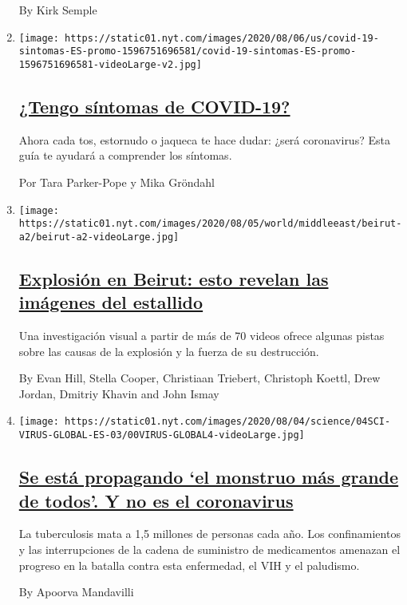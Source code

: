 \begin{enumerate}
  By Kirk Semple
\item
  \texttt{[image: https://static01.nyt.com/images/2020/08/06/us/covid-19-sintomas-ES-promo-1596751696581/covid-19-sintomas-ES-promo-1596751696581-videoLarge-v2.jpg]}

  \hypertarget{tengo-suxedntomas-de-covid-19}{%
  \subsection{\texorpdfstring{\href{/es/interactive/2020/08/06/espanol/ciencia-y-tecnologia/tengo-covid-19-sintomas.html}{¿Tengo
  síntomas de
  COVID-19?}}{¿Tengo síntomas de COVID-19?}}\label{tengo-suxedntomas-de-covid-19}}

  Ahora cada tos, estornudo o jaqueca te hace dudar: ¿será coronavirus?
  Esta guía te ayudará a comprender los síntomas.

  Por Tara Parker-Pope y Mika Gröndahl
\item
  \texttt{[image: https://static01.nyt.com/images/2020/08/05/world/middleeast/beirut-a2/beirut-a2-videoLarge.jpg]}

  \hypertarget{explosiuxf3n-en-beirut-esto-revelan-las-imuxe1genes-del-estallido}{%
  \subsection{\texorpdfstring{\href{/es/2020/08/06/espanol/mundo/beirut-video-explosion-libano.html}{Explosión
  en Beirut: esto revelan las imágenes del
  estallido}}{Explosión en Beirut: esto revelan las imágenes del estallido}}\label{explosiuxf3n-en-beirut-esto-revelan-las-imuxe1genes-del-estallido}}

  Una investigación visual a partir de más de 70 videos ofrece algunas
  pistas sobre las causas de la explosión y la fuerza de su destrucción.

  By Evan Hill, Stella Cooper, Christiaan Triebert, Christoph Koettl,
  Drew Jordan, Dmitriy Khavin and John Ismay
\item
  \texttt{[image: https://static01.nyt.com/images/2020/08/04/science/04SCI-VIRUS-GLOBAL-ES-03/00VIRUS-GLOBAL4-videoLarge.jpg]}

  \hypertarget{se-estuxe1-propagando-el-monstruo-muxe1s-grande-de-todos-y-no-es-el-coronavirus}{%
  \subsection{\texorpdfstring{\href{/es/2020/08/05/espanol/ciencia-y-tecnologia/tuberculosis-malaria-coronavirus.html}{Se
  está propagando `el monstruo más grande de todos'. Y no es el
  coronavirus}}{Se está propagando `el monstruo más grande de todos'. Y no es el coronavirus}}\label{se-estuxe1-propagando-el-monstruo-muxe1s-grande-de-todos-y-no-es-el-coronavirus}}

  La tuberculosis mata a 1,5 millones de personas cada año. Los
  confinamientos y las interrupciones de la cadena de suministro de
  medicamentos amenazan el progreso en la batalla contra esta
  enfermedad, el VIH y el paludismo.

  By Apoorva Mandavilli
\end{enumerate}

